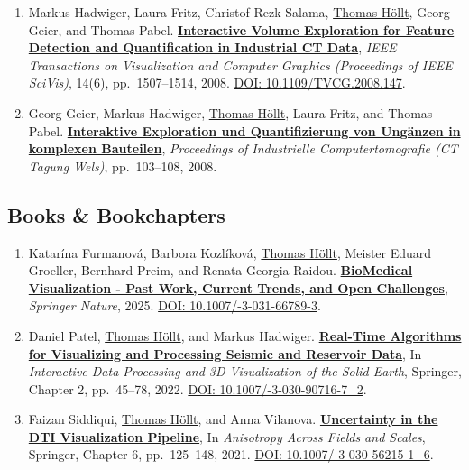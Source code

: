 \documentclass[10pt,a4paper,roman,final]{moderncv}
\newcommand*\highlightauthor[1]{\underline{#1}}
\begin{document}
\begin{enumerate}[leftmargin=0cm,start=2]
\item
Markus Hadwiger, Laura Fritz, Christof Rezk-Salama, \highlightauthor{Thomas Höllt}, Georg Geier, and Thomas Pabel.
\href{https://www.thomashollt.com/publications/2008_vis/}{\textbf{Interactive Volume Exploration for Feature Detection and Quantification in Industrial CT Data}},
\emph{IEEE Transactions on Visualization and Computer Graphics (Proceedings of IEEE SciVis)}, 14(6), pp.~1507--1514,
2008.
\href{https://doi.org/10.1109/TVCG.2008.147}{DOI: 10.1109/\allowbreak TVCG.2008.147}.


\item
Georg Geier, Markus Hadwiger, \highlightauthor{Thomas Höllt}, Laura Fritz, and Thomas Pabel.
\href{https://www.thomashollt.com/publications/2008_geier/}{\textbf{Interaktive Exploration und Quantifizierung von Ungänzen in komplexen Bauteilen}},
\emph{Proceedings of Industrielle Computertomografie (CT Tagung Wels)}, pp.~103--108,
2008.


\end{enumerate}

\subsection*{Books \& Bookchapters}
\begin{enumerate}[leftmargin=0cm,start=73]
\item
Katarína Furmanová, Barbora Kozlíková, \highlightauthor{Thomas Höllt}, Meister Eduard Groeller, Bernhard Preim, and Renata Georgia Raidou.
\href{https://www.thomashollt.com/publications/2024_book/}{\textbf{BioMedical Visualization - Past Work, Current Trends, and Open Challenges}},
\emph{Springer Nature},
2025.
\href{https://doi.org/10.1007/978-3-031-66789-3}{DOI: 10.1007/-3-031-66789-3}.


\item
Daniel Patel, \highlightauthor{Thomas Höllt}, and Markus Hadwiger.
\href{https://www.thomashollt.com/publications/2022_seismic/}{\textbf{Real-Time Algorithms for Visualizing and Processing Seismic and Reservoir Data}},
In \emph{Interactive Data Processing and 3D Visualization of the Solid Earth}, Springer, Chapter 2, pp.~45--78,
2022.
\href{https://doi.org/10.1007/978-3-030-90716-7_2}{DOI: 10.1007/-3-030-90716-7\_2}.


\item
Faizan Siddiqui, \highlightauthor{Thomas Höllt}, and Anna Vilanova.
\href{https://www.thomashollt.com/publications/2021_tract_uncertainty_chapter/}{\textbf{Uncertainty in the DTI Visualization Pipeline}},
In \emph{Anisotropy Across Fields and Scales}, Springer, Chapter 6, pp.~125--148,
2021.
\href{https://doi.org/10.1007/978-3-030-56215-1_6}{DOI: 10.1007/-3-030-56215-1\_6}.


\end{enumerate}
\end{document}
